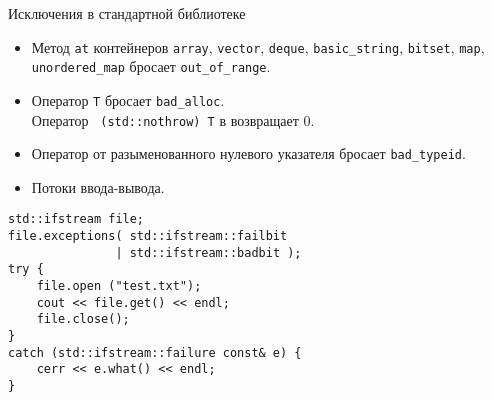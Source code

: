 \documentclass[aspectration=1610,t]{beamer}
\begin{document}
\begin{frame}[fragile]{Исключения в стандартной библиотеке}
    \begin{itemize}
        \item Метод \texttt{at} контейнеров {\tt array}, {\tt vector}, {\tt deque}, {\tt basic\_string}, {\tt bitset}, {\tt map}, {\tt unordered\_map} бросает {\tt out\_of\_range}.

        \item Оператор  {\tt T} бросает {\tt bad\_alloc}.\\
            Оператор {\tt {} (std::nothrow) T} в возвращает 0.
            
        \item Оператор  от разыменованного нулевого указателя бросает {\tt bad\_typeid}.

        \item Потоки ввода-вывода. 
    \end{itemize}
            \begin{lstlisting}
std::ifstream file;
file.exceptions( std::ifstream::failbit 
               | std::ifstream::badbit );
try {
    file.open ("test.txt");
    cout << file.get() << endl;
    file.close();
}
catch (std::ifstream::failure const& e) {
    cerr << e.what() << endl;
}
            \end{lstlisting}
\end{frame}
\end{document}
